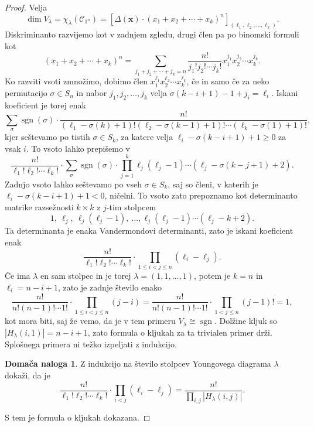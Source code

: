 \documentclass[11pt]{book}
\def\conclass{\mathcal{C}}
\DeclareMathOperator\sgn{sgn}
\theoremstyle{definition}
\theoremstyle{zgled}
\theoremstyle{odprtproblem}
\theoremstyle{domacanaloga}
\newtheorem*{domacanaloga}{Domača naloga}
\newenvironment{dokaz}
    {\color{siva}\begin{proof}}
    {\end{proof}}
\theoremstyle{izrek}
\begin{document}
\begin{dokaz}
Velja 
\[
    \dim V_{\lambda} = \chi_{\lambda}(\conclass_{1^n}) =
    \left[ \Delta(\mathbf{x}) \cdot (x_1 + x_2 + \cdots + x_k)^n \right]_{(\ell_1, \ell_2, \dots, \ell_k)}.
\]
Diskriminanto razvijemo kot v zadnjem zgledu, drugi člen pa po binomski formuli kot
\[
    (x_1 + x_2 + \cdots + x_k)^n = \sum_{j_1 + j_2 + \cdots + j_k = n} \frac{n!}{j_1! j_2! \cdots j_k!} x_1^{j_1} x_2^{j_2} \cdots x_k^{j_k}.
\]
Ko razviti vsoti zmnožimo, dobimo člen $x_1^{\ell_1} x_2^{\ell_2} \cdots x_k^{\ell_k}$, če in samo če za neko permutacijo $\sigma \in S_n$ in nabor $j_1, j_2, \dots, j_k$ velja $\sigma(k - i + 1) - 1 + j_i = \ell_i$. Iskani koeficient je torej enak
\[
    \sum_{\sigma} \sgn(\sigma) \cdot \frac{n!}{(\ell_1 - \sigma(k) + 1)! (\ell_2 - \sigma(k-1) + 1)! \cdots (\ell_k - \sigma(1) + 1)!},
\]
kjer seštevamo po tistih $\sigma \in S_k$, za katere velja $\ell_i - \sigma(k-i+1) + 1 \geq 0$ za vsak $i$. To vsoto lahko prepišemo v
\[
    \frac{n!}{\ell_1! \ell_2! \cdots \ell_k!} \cdot \sum_{\sigma} \sgn(\sigma) \cdot \prod_{j = 1}^k \ell_j (\ell_j - 1) \cdots (\ell_j - \sigma(k-j+1) + 2). 
\]
Zadnjo vsoto lahko seštevamo po vseh $\sigma \in S_k$, saj so členi, v katerih je $\ell_i - \sigma(k-i+1) + 1 < 0$, ničelni. To vsoto zato prepoznamo kot determinanto matrike razsežnosti $k \times k$ z $j$-tim stolpcem
\[
    1, \ \ell_j, \ \ell_j(\ell_j - 1), \ \dots, \ell_j(\ell_j - 1) \cdots (\ell_j - k + 2). 
\]
Ta determinanta je enaka Vandermondovi determinanti, zato je iskani koeficient enak
\[
    \frac{n!}{\ell_1! \ell_2! \cdots \ell_k!} \cdot \prod_{1 \leq i < j \leq n} (\ell_i - \ell_j).
\]
Če ima $\lambda$ en sam stolpec in je torej $\lambda = (1,1,\dots,1)$, potem je $k = n$ in $\ell_i = n - i + 1$, zato je zadnje število enako
\[
    \frac{n!}{n! (n-1)! \cdots 1!} \cdot \prod_{1 \leq i < j \leq n} (j-i) =
    \frac{n!}{n! (n-1)! \cdots 1!} \cdot \prod_{1 < j \leq n} (j-1)! =
    1,
\]
kot mora biti, saj že vemo, da je v tem primeru $V_{\lambda} \cong \sgn$. Dolžine kljuk so $|H_{\lambda}(i,1)| = n - i + 1$, zato formula o kljukah za ta trivialen primer drži. Splošnega primera ni težko izpeljati z indukcijo.

\begin{domacanaloga}
Z indukcijo na število stolpcev Youngovega diagrama $\lambda$ dokaži, da je
\[
    \frac{n!}{\ell_1! \ell_2! \cdots \ell_k!} \cdot \prod_{i < j} (\ell_i - \ell_j) = \frac{n!}{\prod_{i,j}|H_{\lambda}(i,j)|}.
\]
\end{domacanaloga}

S tem je formula o kljukah dokazana.
\end{dokaz}
\end{document}
